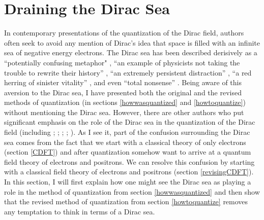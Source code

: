 \documentclass[onecolumn,secnumarabic,amsmath,amssymb,balancelastpage,nofootinbib]{article}
\begin{document}
\section{Draining the Dirac Sea}\label{diracsea}

In contemporary presentations of the quantization of the Dirac field, authors often seek to avoid any mention of Dirac's idea that space is filled with an infinite sea of negative energy electrons.  The Dirac sea has been described derisively as a ``potentially confusing metaphor" \citep[pg.\ 113]{zee2010}, ``an example of physicists not taking the trouble to rewrite their history'' \citep[pg.\ 120]{weinberg1985}, ``an extremely persistent distraction'' \citep[pg.\ 39]{duncan}, ``a red herring of sinister vitality'' \citep[pg.\ 34]{duncan}, and even ``total nonsense'' \citep[pg.\ 142]{schwartz}.  Being aware of this aversion to the Dirac sea, I have presented both the original and the revised methods of quantization (in sections \ref{howwasquantized} and \ref{howtoquantize}) without mentioning the Dirac sea.  However, there are other authors who put significant emphasis on the role of the Dirac sea in the quantization of the Dirac field (including \citealp[sec.\ 12]{heitler}; \citealp[sec.\ 8a]{schweberQFT}; \citealp[sec.\ 13.4]{bjorkendrellfields}; \citealp{hatfield}; \citealp[sec.\ 5.3]{greiner1996}).  As I see it, part of the confusion surrounding the Dirac sea comes from the fact that we start with a classical theory of only electrons (section \ref{CDFT}) and after quantization somehow want to arrive at a quantum field theory of electrons and positrons.  We can resolve this confusion by starting with a classical field theory of electrons and positrons (section \ref{revisingCDFT}).  In this section, I will first explain how one might see the Dirac sea as playing a role in the method of quantization from section \ref{howwasquantized} and then show that the revised method of quantization from section \ref{howtoquantize} removes any temptation to think in terms of a Dirac sea.
\end{document}
